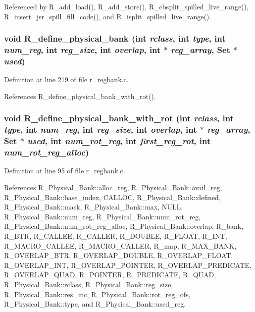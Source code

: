 Referenced by R\_\-add\_\-load(), R\_\-add\_\-store(), R\_\-cbsplit\_\-spilled\_\-live\_\-range(), R\_\-insert\_\-jsr\_\-spill\_\-fill\_\-code(), and R\_\-isplit\_\-spilled\_\-live\_\-range().
\subsubsection{\setlength{\rightskip}{0pt plus 5cm}void R\_\-define\_\-physical\_\-bank (int {\em rclass}, int {\em type}, int {\em num\_\-reg}, int {\em reg\_\-size}, int {\em overlap}, int $\ast$ {\em reg\_\-array}, \bf{Set} $\ast$ {\em used})}\label{r__regproto_8h_0261576ceab18c14c78be7e5a8bea4aa}




Definition at line 219 of file r\_\-regbank.c.

References R\_\-define\_\-physical\_\-bank\_\-with\_\-rot().
\subsubsection{\setlength{\rightskip}{0pt plus 5cm}void R\_\-define\_\-physical\_\-bank\_\-with\_\-rot (int {\em rclass}, int {\em type}, int {\em num\_\-reg}, int {\em reg\_\-size}, int {\em overlap}, int $\ast$ {\em reg\_\-array}, \bf{Set} $\ast$ {\em used}, int {\em num\_\-rot\_\-reg}, int {\em first\_\-reg\_\-rot}, int {\em num\_\-rot\_\-reg\_\-alloc})}\label{r__regproto_8h_c936709b1e78ee4a52223c4486be05ec}




Definition at line 95 of file r\_\-regbank.c.

References R\_\-Physical\_\-Bank::alloc\_\-reg, R\_\-Physical\_\-Bank::avail\_\-reg, R\_\-Physical\_\-Bank::base\_\-index, CALLOC, R\_\-Physical\_\-Bank::defined, R\_\-Physical\_\-Bank::mask, R\_\-Physical\_\-Bank::max, NULL, R\_\-Physical\_\-Bank::num\_\-reg, R\_\-Physical\_\-Bank::num\_\-rot\_\-reg, R\_\-Physical\_\-Bank::num\_\-rot\_\-reg\_\-alloc, R\_\-Physical\_\-Bank::overlap, R\_\-bank, R\_\-BTR, R\_\-CALLEE, R\_\-CALLER, R\_\-DOUBLE, R\_\-FLOAT, R\_\-INT, R\_\-MACRO\_\-CALLEE, R\_\-MACRO\_\-CALLER, R\_\-map, R\_\-MAX\_\-BANK, R\_\-OVERLAP\_\-BTR, R\_\-OVERLAP\_\-DOUBLE, R\_\-OVERLAP\_\-FLOAT, R\_\-OVERLAP\_\-INT, R\_\-OVERLAP\_\-POINTER, R\_\-OVERLAP\_\-PREDICATE, R\_\-OVERLAP\_\-QUAD, R\_\-POINTER, R\_\-PREDICATE, R\_\-QUAD, R\_\-Physical\_\-Bank::rclass, R\_\-Physical\_\-Bank::reg\_\-size, R\_\-Physical\_\-Bank::res\_\-inc, R\_\-Physical\_\-Bank::rot\_\-reg\_\-ofs, R\_\-Physical\_\-Bank::type, and R\_\-Physical\_\-Bank::used\_\-reg.

